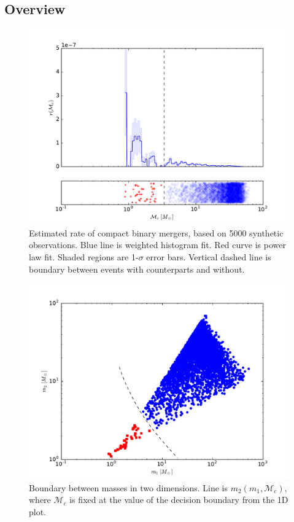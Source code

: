 \subsection{Overview}

\begin{figure}[ht]
  \includegraphics[width=\columnwidth]{img/chirp-mass-distribution}
  \caption{Estimated rate of compact binary mergers, based on 5000 synthetic observations. Blue line is weighted histogram fit. Red curve is power law fit. Shaded regions are 1-$\sigma$ error bars. Vertical dashed line is boundary between events with counterparts and without.}
  \label{fig:chirp}
\end{figure}

\begin{figure}[ht]
  \includegraphics[width=\columnwidth]{img/mass-distribution}
  \caption{Boundary between masses in two dimensions. Line is $m_2(m_1, \mathcal{M}_c)$, where $\mathcal{M}_c$ is fixed at the value of the decision boundary from the 1D plot.}
  \label{fig:2D}
\end{figure}

